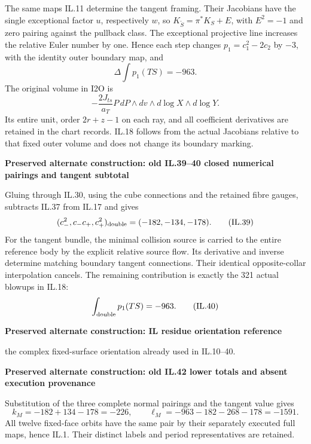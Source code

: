 The same maps IL.11 determine the tangent framing. Their
Jacobians have the single exceptional factor \(u\), respectively
\(w\), so \(K_{\widetilde S}=\pi^*K_S+E\), with
\(E^2=-1\) and zero pairing against the pullback class. The
exceptional projective line increases the relative Euler number
by one. Hence each step changes \(p_1=c_1^2-2c_2\) by \(-3\),
with the identity outer boundary map, and
\[
            \Delta\!\int p_1(TS)=-963.
 \tag{IL.18}
\]
The original volume in I2O is
\[
 -\frac{2J_{ts}}{a_T}P\,dP\wedge dv\wedge d\log X\wedge d\log Y.
 \tag{IL.19}
\]
Its entire unit, order \(2r+z-1\) on each ray, and all
coefficient derivatives are retained in the chart records.
IL.18 follows from the actual Jacobians relative to that fixed
outer volume and does not change its boundary marking.

\par



\par\bigskip\noindent\textbf{Preserved alternate construction: old IL.39--40 closed numerical pairings and tangent subtotal}\par
Gluing through
IL.30, using the cube connections and the retained fibre
gauges, subtracts IL.37 from IL.17 and gives
\[
       (c_-^2,c_-c_+,c_+^2)_{\rm double}
                           =(-182,-134,-178).
 \tag{IL.39}
\]
For the tangent bundle, the minimal collision source is
carried to the entire reference body by the explicit
relative source flow. Its derivative and inverse determine
matching boundary tangent connections. Their identical
opposite-collar interpolation cancels. The remaining
contribution is exactly the 321 actual blowups in IL.18:
\[
                 \int_{\rm double}p_1(TS)=-963.
 \tag{IL.40}
\]


\par\bigskip\noindent\textbf{Preserved alternate construction: IL residue orientation reference}\par
the complex fixed-surface orientation already used in
IL.10--40.

\par\bigskip\noindent\textbf{Preserved alternate construction: old IL.42 lower totals and absent execution provenance}\par
Substitution of the three complete normal pairings and
the tangent value gives
\[
 k_M=-182+134-178=-226,\qquad
 \ell_M=-963-182-268-178=-1591.
 \tag{IL.42}
\]
All twelve fixed-face orbits have the same pair by their
separately executed full maps, hence IL.1. Their distinct
labels and period representatives are retained.

